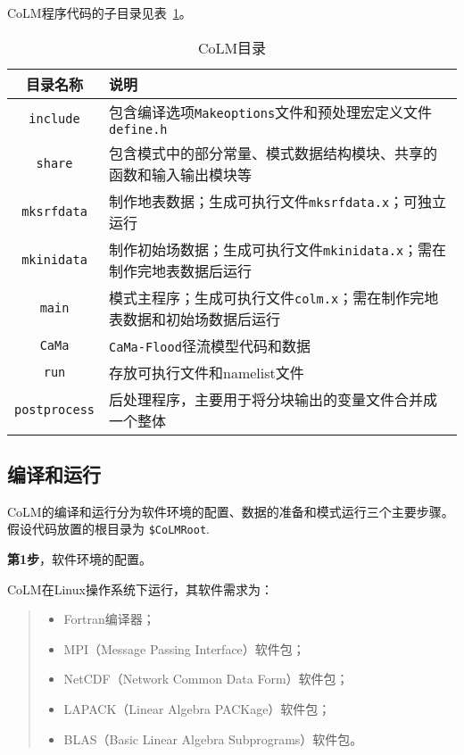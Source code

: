 \documentclass[a4paper,12pt,twoside]{article}
\begin{document}
CoLM程序代码的子目录见表~\ref{subdirectories}。
\begin{table}[!htbp]
\caption{CoLM目录} \label{subdirectories}
\centering \renewcommand{\arraystretch}{1.5}
\begin{tabular}{cp{}}
\toprule
\textbf{目录名称} & \textbf{说明} \\
\midrule
\texttt{include} & 包含编译选项\texttt{Makeoptions}文件和预处理宏定义文件\texttt{define.h} \\
\texttt{share} & 包含模式中的部分常量、模式数据结构模块、共享的函数和输入输出模块等 \\
\texttt{mksrfdata} & 制作地表数据；生成可执行文件\texttt{mksrfdata.x}；可独立运行 \\
\texttt{mkinidata} & 制作初始场数据；生成可执行文件\texttt{mkinidata.x}；需在制作完地表数据后运行\\
\texttt{main} & 模式主程序；生成可执行文件\texttt{colm.x}；需在制作完地表数据和初始场数据后运行\\
\texttt{CaMa} & \texttt{CaMa-Flood}径流模型代码和数据 \\
\texttt{run} & 存放可执行文件和namelist文件 \\
\texttt{postprocess} & 后处理程序，主要用于将分块输出的变量文件合并成一个整体 \\
\bottomrule
\end{tabular}
\end{table}

\subsection{编译和运行}\label{comprun}

CoLM的编译和运行分为软件环境的配置、数据的准备和模式运行三个主要步骤。假设代码放置的根目录为 \texttt{\$CoLMRoot}.

\textbf{第1步}，软件环境的配置。

CoLM在Linux操作系统下运行，其软件需求为：
\begin{quote}
\begin{itemize}
\setlength{\itemsep}{0pt}
\setlength{\parsep}{0pt}
\setlength{\parskip}{0pt}
    \item Fortran编译器；
    \item MPI（Message Passing Interface）软件包；
    \item NetCDF（Network Common Data Form）软件包；
    \item LAPACK（Linear Algebra PACKage）软件包；
    \item BLAS（Basic Linear Algebra Subprograms）软件包。
\end{itemize}
\end{quote}
\end{document}
